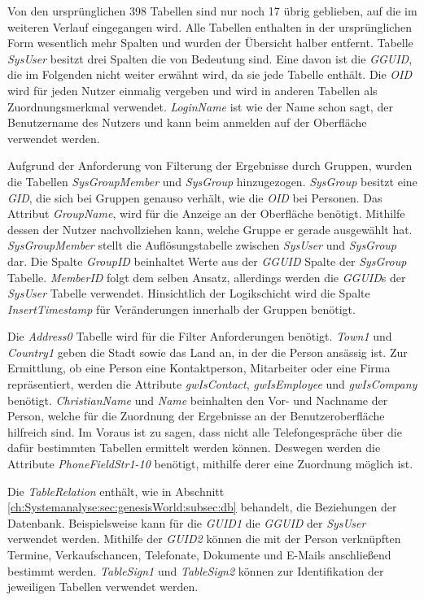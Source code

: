 Von den ursprünglichen 398 Tabellen sind nur noch 17 übrig geblieben, auf die im weiteren Verlauf eingegangen wird. Alle Tabellen enthalten in der ursprünglichen Form wesentlich mehr Spalten und wurden der Übersicht halber entfernt. Tabelle \textit{SysUser} besitzt drei Spalten die von Bedeutung sind. Eine davon ist die \textit{GGUID}, die im Folgenden nicht weiter erwähnt wird, da sie jede Tabelle enthält. Die \textit{OID} wird für jeden Nutzer einmalig vergeben und wird in anderen Tabellen als Zuordnungsmerkmal verwendet. \textit{LoginName} ist wie der Name schon sagt, der Benutzername des Nutzers und kann beim anmelden auf der Oberfläche verwendet werden. 

Aufgrund der Anforderung von Filterung der Ergebnisse durch Gruppen, wurden die Tabellen \textit{SysGroupMember} und \textit{SysGroup} hinzugezogen. \textit{SysGroup} besitzt eine \textit{GID}, die sich bei Gruppen genauso verhält, wie die \textit{OID} bei Personen. Das Attribut \textit{GroupName}, wird für die Anzeige an der Oberfläche benötigt. Mithilfe dessen der Nutzer nachvollziehen kann, welche Gruppe er gerade ausgewählt hat. \textit{SysGroupMember} stellt die Auflösungstabelle zwischen \textit{SysUser} und \textit{SysGroup} dar. Die Spalte \textit{GroupID} beinhaltet Werte aus der \textit{GGUID} Spalte der \textit{SysGroup} Tabelle. \textit{MemberID} folgt dem selben Ansatz, allerdings werden die \textit{GGUID}s der \textit{SysUser} Tabelle verwendet. Hinsichtlich der Logikschicht wird die Spalte \textit{InsertTimestamp} für Veränderungen innerhalb der Gruppen benötigt.

Die \textit{Address0} Tabelle wird für die Filter Anforderungen benötigt. \textit{Town1} und \textit{Country1} geben die Stadt sowie das Land an, in der die Person ansässig ist. Zur Ermittlung, ob eine Person eine Kontaktperson, Mitarbeiter oder eine Firma repräsentiert, werden die Attribute \textit{gwIsContact}, \textit{gwIsEmployee} und \textit{gwIsCompany} benötigt. \textit{ChristianName} und \textit{Name} beinhalten den Vor- und Nachname der Person, welche für die Zuordnung der Ergebnisse an der Benutzeroberfläche hilfreich sind. Im Voraus ist zu sagen, dass nicht alle Telefongespräche über die dafür bestimmten Tabellen ermittelt werden können. Deswegen werden die Attribute \textit{PhoneFieldStr1-10} benötigt, mithilfe derer eine Zuordnung möglich ist. 

Die \textit{TableRelation} enthält, wie in Abschnitt \ref{ch:Systemanalyse:sec:genesisWorld:subsec:db} behandelt, die Beziehungen der Datenbank. Beispielsweise kann für die \textit{GUID1} die \textit{GGUID} der \textit{SysUser} verwendet werden. Mithilfe der \textit{GUID2} können die mit der Person verknüpften Termine, Verkaufschancen, Telefonate, Dokumente und E-Mails anschließend bestimmt werden. \textit{TableSign1} und \textit{TableSign2} können zur Identifikation der jeweiligen Tabellen verwendet werden.

